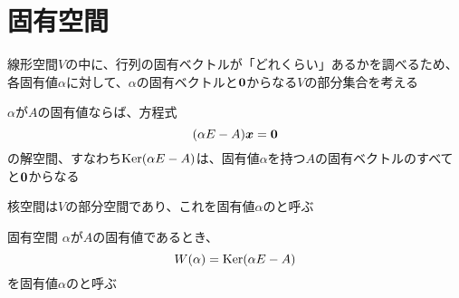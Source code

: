 \documentclass[../../../topic_linear-algebra]{subfiles}
\begin{document}
\sectionline
\section{固有空間}

線形空間$V$の中に、行列の固有ベクトルが「どれくらい」あるかを調べるため、各固有値$\alpha$に対して、$\alpha$の固有ベクトルと$\vb*{0}$からなる$V$の部分集合を考える

\br

$\alpha$が$A$の固有値ならば、方程式
\begin{equation*}
  (\alpha E - A)\vb*{x} = \vb*{0}
\end{equation*}
の解空間、すなわち$\operatorname{Ker}(\alpha E - A)$は、固有値$\alpha$を持つ$A$の固有ベクトルのすべてと$\vb*{0}$からなる

\br

核空間は$V$の部分空間であり、これを固有値$\alpha$のと呼ぶ

\begin{definition}{固有空間}
  $\alpha$が$A$の固有値であるとき、
  \begin{equation*}
    W(\alpha) = \operatorname{Ker}(\alpha E - A)
  \end{equation*}
  を固有値$\alpha$のと呼ぶ
\end{definition}
\end{document}
